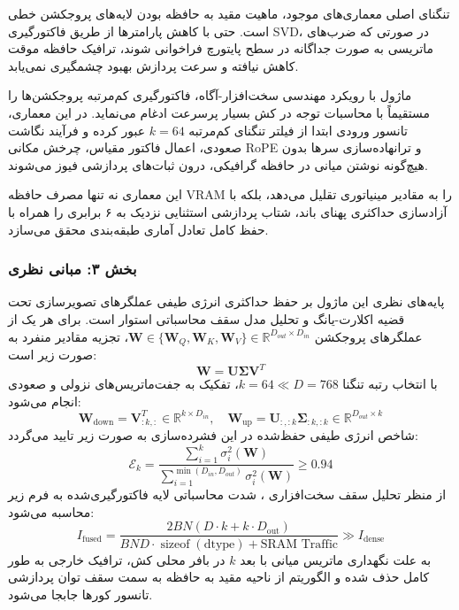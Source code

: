 تنگنای اصلی معماری‌های موجود، ماهیت مقید به حافظه  بودن لایه‌های پروجکشن خطی است. حتی با کاهش پارامترها از طریق فاکتورگیری SVD، در صورتی که ضرب‌های ماتریسی به صورت جداگانه در سطح پایتورچ فراخوانی شوند، ترافیک حافظه موقت کاهش نیافته و سرعت پردازش بهبود چشمگیری نمی‌یابد.

ماژول  با رویکرد مهندسی سخت‌افزار-آگاه، فاکتورگیری کم‌مرتبه پروجکشن‌ها را مستقیماً با محاسبات توجه در کش بسیار پرسرعت  ادغام می‌نماید. در این معماری، تانسور ورودی ابتدا از فیلتر تنگنای کم‌مرتبه $k=64$ عبور کرده و فرآیند نگاشت صعودی، اعمال فاکتور مقیاس، چرخش مکانی RoPE و ترانهاده‌سازی سرها بدون هیچ‌گونه نوشتن میانی در حافظه گرافیکی، درون ثبات‌های پردازشی فیوز می‌شوند.

این معماری نه تنها مصرف حافظه VRAM را به مقادیر مینیاتوری تقلیل می‌دهد، بلکه با آزادسازی حداکثری پهنای باند، شتاب پردازشی استثنایی نزدیک به ۶ برابری را همراه با حفظ کامل تعادل آماری طبقه‌بندی محقق می‌سازد.

\subsubsection*{بخش ۳: مبانی نظری }
پایه‌های نظری این ماژول بر حفظ حداکثری انرژی طیفی عملگرهای تصویرسازی تحت قضیه اکلارت-یانگ و تحلیل مدل سقف محاسباتی استوار است.
برای هر یک از عملگرهای پروجکشن $\mathbf{W} \in \{\mathbf{W}_Q, \mathbf{W}_K, \mathbf{W}_V\} \in \mathbb{R}^{D_{out} \times D_{in}}$، تجزیه مقادیر منفرد به صورت زیر است:
\begin{equation}
\mathbf{W} = \mathbf{U} \mathbf{\Sigma} \mathbf{V}^T
\end{equation}
با انتخاب رتبه تنگنا $k = 64 \ll D = 768$، تفکیک به جفت‌ماتریس‌های نزولی و صعودی انجام می‌شود:
\begin{equation}
\mathbf{W}_{\text{down}} = \mathbf{V}_{:k, :}^T \in \mathbb{R}^{k \times D_{in}}, \quad \mathbf{W}_{\text{up}} = \mathbf{U}_{:, :k} \mathbf{\Sigma}_{:k, :k} \in \mathbb{R}^{D_{out} \times k}
\end{equation}
شاخص انرژی طیفی حفظ‌شده در این فشرده‌سازی به صورت زیر تایید می‌گردد:
\begin{equation}
\mathcal{E}_k = \frac{\sum_{i=1}^k \sigma_i^2(\mathbf{W})}{\sum_{i=1}^{\min(D_{in}, D_{out})} \sigma_i^2(\mathbf{W})} \ge 0.94
\end{equation}
از منظر تحلیل سقف سخت‌افزاری ، شدت محاسباتی لایه فاکتورگیری‌شده به فرم زیر محاسبه می‌شود:
\begin{equation}
I_{\text{fused}} = \frac{2 B N (D \cdot k + k \cdot D_{\text{out}})}{B N D \cdot \operatorname{sizeof}(\text{dtype}) + \text{SRAM Traffic}} \gg I_{\text{dense}}
\end{equation}
به علت نگهداری ماتریس میانی با بعد $k$ در بافر محلی کش، ترافیک خارجی به طور کامل حذف شده و الگوریتم از ناحیه مقید به حافظه به سمت سقف توان پردازشی تانسور کورها جابجا می‌شود.

